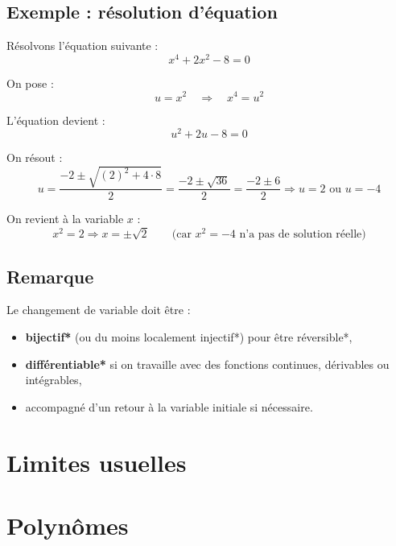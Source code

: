 \documentclass[12]{article}%
\theoremstyle{plain}
\theoremstyle{definition}
\theoremstyle{remark}
\begin{document}
\subsection*{Exemple : résolution d'équation}

Résolvons l'équation suivante :
\[
x^4 + 2x^2 - 8 = 0
\]

On pose :
\[
u = x^2 \quad \Rightarrow \quad x^4 = u^2
\]

L'équation devient :
\[
u^2 + 2u - 8 = 0
\]

On résout :
\[
u = \frac{-2 \pm \sqrt{(2)^2 + 4 \cdot 8}}{2} = \frac{-2 \pm \sqrt{36}}{2} = \frac{-2 \pm 6}{2}
\Rightarrow u = 2 \text{ ou } u = -4
\]

On revient à la variable \( x \) :
\[
x^2 = 2 \Rightarrow x = \pm \sqrt{2} \qquad \text{(car } x^2 = -4 \text{ n'a pas de solution réelle)}
\]

\subsection*{Remarque}

Le changement de variable doit être :
\begin{itemize}
	\item \textbf{bijectif*} (ou du moins localement injectif*) pour être réversible*,
	\item \textbf{différentiable*} si on travaille avec des fonctions continues, dérivables ou intégrables,
	\item accompagné d'un retour à la variable initiale si nécessaire.
\end{itemize}

\newpage
\section{Limites usuelles}


\newpage
\section{Polynômes}
\end{document}
